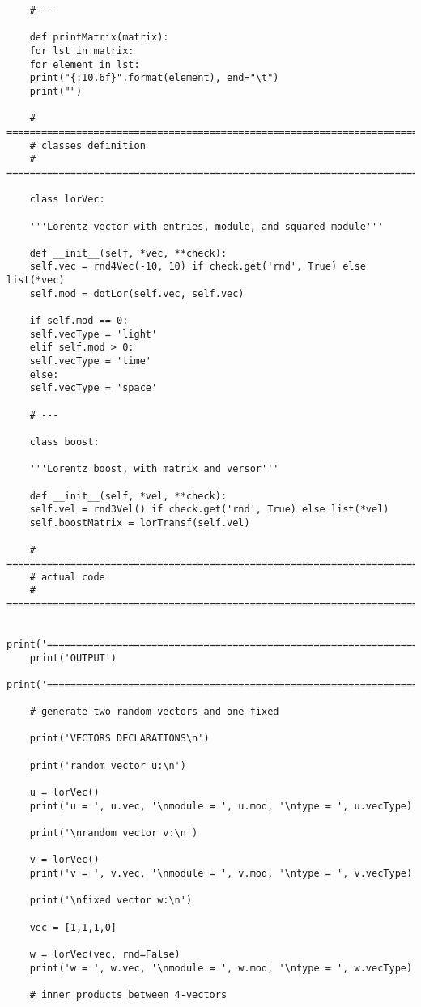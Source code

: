 \documentclass[12pt,notitlepage]{report}
\begin{document}
\begin{verbatim}
	# ---
	
	def printMatrix(matrix):
	for lst in matrix:
	for element in lst:
	print("{:10.6f}".format(element), end="\t")
	print("")
	
	# =============================================================================
	# classes definition
	# =============================================================================
	
	class lorVec:
	
	'''Lorentz vector with entries, module, and squared module'''
	
	def __init__(self, *vec, **check):
	self.vec = rnd4Vec(-10, 10) if check.get('rnd', True) else list(*vec)
	self.mod = dotLor(self.vec, self.vec)
	
	if self.mod == 0:
	self.vecType = 'light'
	elif self.mod > 0:
	self.vecType = 'time'
	else:
	self.vecType = 'space'
	
	# ---
	
	class boost:
	
	'''Lorentz boost, with matrix and versor'''
	
	def __init__(self, *vel, **check):
	self.vel = rnd3Vel() if check.get('rnd', True) else list(*vel)
	self.boostMatrix = lorTransf(self.vel)
	
	# =============================================================================
	# actual code
	# =============================================================================
	
	print('======================================================================')
	print('OUTPUT')
	print('======================================================================')
	
	# generate two random vectors and one fixed
	
	print('VECTORS DECLARATIONS\n')
	
	print('random vector u:\n')
	
	u = lorVec()
	print('u = ', u.vec, '\nmodule = ', u.mod, '\ntype = ', u.vecType)
	
	print('\nrandom vector v:\n')
	
	v = lorVec()
	print('v = ', v.vec, '\nmodule = ', v.mod, '\ntype = ', v.vecType)
	
	print('\nfixed vector w:\n')
	
	vec = [1,1,1,0]
	
	w = lorVec(vec, rnd=False)
	print('w = ', w.vec, '\nmodule = ', w.mod, '\ntype = ', w.vecType)
	
	# inner products between 4-vectors
	

\end{verbatim}
\end{document}
